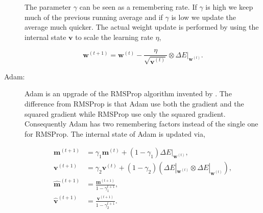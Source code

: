 \begin{description}
        The parameter $\gamma$ can be seen as a remembering rate. If $\gamma$
        is high we keep much of the previous running average and if $\gamma$
        is low we update the average much quicker. The actual weight update is
        performed by using the internal state $\mathbf{v}$ to scale the learning
        rate $\eta$,

        \begin{equation}
            \mathbf{w}^{(t+1)} =
                \mathbf{w}^{(t)} -
                \frac{\eta}{\sqrt{\mathbf{v}^{(t)}}} \otimes
                \Delta E|_{\mathbf{w}^{(t)}}.
        \end{equation}

    \item[\gls{Adam}:]

        \gls{Adam} is an upgrade of the \gls{RMSProp} algorithm invented by
        \citet{DBLP:journals/corr/KingmaB14}. The difference from \gls{RMSProp}
        is that \gls{Adam} use both the gradient and the squared gradient while
        \gls{RMSProp} use only the squared gradient. Consequently \gls{Adam} has
        two remembering factors instead of the single one for \gls{RMSProp}. The
        internal state of \gls{Adam} is updated via,

        \begin{align}
            \mathbf{m}^{(t+1)} &=
                \gamma_1\mathbf{m}^{(t)} +
                (1 - \gamma_1) \Delta E|_{\mathbf{w}^{(t)}}, \\
            \mathbf{v}^{(t+1)} &=
                \gamma_2\mathbf{v}^{(t)} +
                (1 - \gamma_2) \left(
                    \Delta E|_{\mathbf{w}^{(t)}} \otimes \Delta E|_{\mathbf{w}^{(t)}}
                \right), \\
            \mathbf{\hat{m}}^{(t+1)} &=
                \frac{\mathbf{m}^{(t+1)}}{1 - \gamma_1^{t + 1}}, \\
            \mathbf{\hat{v}}^{(t+1)} &=
                \frac{\mathbf{v}^{(t+1)}}{1 - \gamma_2^{t + 1}}.
        \end{align}


\end{description}
